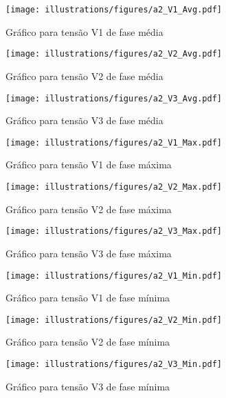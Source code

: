 \begin{figure}[H]
	\centering
	\caption{Gráfico para tensão V1 de fase média}
    \texttt{[image: illustrations/figures/a2\_V1\_Avg.pdf]}
\end{figure}

\begin{figure}[H]
	\centering
	\caption{Gráfico para tensão V2 de fase média}
    \texttt{[image: illustrations/figures/a2\_V2\_Avg.pdf]}
\end{figure}

\begin{figure}[H]
	\centering
	\caption{Gráfico para tensão V3 de fase média}
    \texttt{[image: illustrations/figures/a2\_V3\_Avg.pdf]}
\end{figure}

\begin{figure}[H]
	\centering
	\caption{Gráfico para tensão V1 de fase máxima}
    \texttt{[image: illustrations/figures/a2\_V1\_Max.pdf]}
\end{figure}

\begin{figure}[H]
	\centering
	\caption{Gráfico para tensão V2 de fase máxima}
    \texttt{[image: illustrations/figures/a2\_V2\_Max.pdf]}
\end{figure}

\begin{figure}[H]
	\centering
	\caption{Gráfico para tensão V3 de fase máxima}
    \texttt{[image: illustrations/figures/a2\_V3\_Max.pdf]}
\end{figure}

\begin{figure}[H]
	\centering
	\caption{Gráfico para tensão V1 de fase mínima}
    \texttt{[image: illustrations/figures/a2\_V1\_Min.pdf]}
\end{figure}

\begin{figure}[H]
	\centering
	\caption{Gráfico para tensão V2 de fase mínima}
    \texttt{[image: illustrations/figures/a2\_V2\_Min.pdf]}
\end{figure}

\begin{figure}[H]
	\centering
	\caption{Gráfico para tensão V3 de fase mínima}
    \texttt{[image: illustrations/figures/a2\_V3\_Min.pdf]}
\end{figure}

